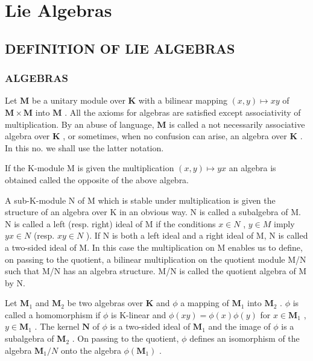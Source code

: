 \chapter{Lie Algebras}

\section{DEFINITION OF LIE ALGEBRAS}

\subsection{ALGEBRAS}

Let \(\mathbf{M}\) be a unitary module over \(\mathbf{K}\) with a bilinear mapping \((x,y)\mapsto xy\) of \(\mathbf{M}\times \mathbf{M}\) into \(\mathbf{M}\) . All the axioms for algebras are satisfied except associativity of multiplication. By an abuse of language, \(\mathbf{M}\) is called a not necessarily associative algebra over \(\mathbf{K}\) , or sometimes, when no confusion can arise, an algebra over \(\mathbf{K}\) . In this no. we shall use the latter notation.

If the K-module M is given the multiplication \((x,y)\mapsto yx\) an algebra is obtained called the opposite of the above algebra.

A sub-K-module N of M which is stable under multiplication is given the structure of an algebra over K in an obvious way. N is called a subalgebra of M. N is called a left (resp. right) ideal of M if the conditions \(x \in N\) , \(y \in M\) imply \(yx \in N\) (resp. \(xy \in N\) ). If N is both a left ideal and a right ideal of M, N is called a two-sided ideal of M. In this case the multiplication on M enables us to define, on passing to the quotient, a bilinear multiplication on the quotient module M/N such that M/N has an algebra structure. M/N is called the quotient algebra of M by N.

Let \(\mathbf{M}_1\) and \(\mathbf{M}_2\) be two algebras over \(\mathbf{K}\) and \(\phi\) a mapping of \(\mathbf{M}_1\) into \(\mathbf{M}_2\) . \(\phi\) is called a homomorphism if \(\phi\) is K-linear and \(\phi(xy) = \phi(x)\phi(y)\) for \(x\in \mathbf{M}_1\) , \(y\in \mathbf{M}_1\) . The kernel \(\mathbf{N}\) of \(\phi\) is a two-sided ideal of \(\mathbf{M}_1\) and the image of \(\phi\) is a subalgebra of \(\mathbf{M}_2\) . On passing to the quotient, \(\phi\) defines an isomorphism of the algebra \(\mathbf{M}_1 / N\) onto the algebra \(\phi (\mathbf{M}_1)\) .

